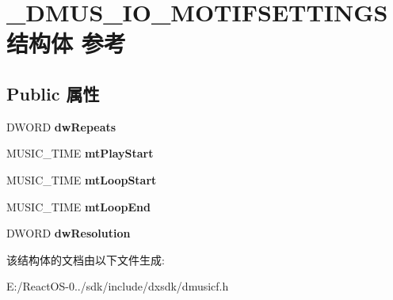 \hypertarget{struct___d_m_u_s___i_o___m_o_t_i_f_s_e_t_t_i_n_g_s}{}\section{\+\_\+\+D\+M\+U\+S\+\_\+\+I\+O\+\_\+\+M\+O\+T\+I\+F\+S\+E\+T\+T\+I\+N\+G\+S结构体 参考}
\label{struct___d_m_u_s___i_o___m_o_t_i_f_s_e_t_t_i_n_g_s}
\subsection*{Public 属性}
\begin{DoxyCompactItemize}
\item 
\mbox{\label{struct___d_m_u_s___i_o___m_o_t_i_f_s_e_t_t_i_n_g_s_a91cc23365415043e01413969b1cba8f9}} 
D\+W\+O\+RD {\bfseries dw\+Repeats}
\item 
\mbox{\label{struct___d_m_u_s___i_o___m_o_t_i_f_s_e_t_t_i_n_g_s_ac7180f66014bd309555893d0487dbc40}} 
M\+U\+S\+I\+C\+\_\+\+T\+I\+ME {\bfseries mt\+Play\+Start}
\item 
\mbox{\label{struct___d_m_u_s___i_o___m_o_t_i_f_s_e_t_t_i_n_g_s_a738e93904caf1188f41ed8041e70a5cf}} 
M\+U\+S\+I\+C\+\_\+\+T\+I\+ME {\bfseries mt\+Loop\+Start}
\item 
\mbox{\label{struct___d_m_u_s___i_o___m_o_t_i_f_s_e_t_t_i_n_g_s_aa4305dfbeef2f94cd519ee60876f41fb}} 
M\+U\+S\+I\+C\+\_\+\+T\+I\+ME {\bfseries mt\+Loop\+End}
\item 
\mbox{\label{struct___d_m_u_s___i_o___m_o_t_i_f_s_e_t_t_i_n_g_s_a0e1ceb3b379d6aef13ed07c1b69ec466}} 
D\+W\+O\+RD {\bfseries dw\+Resolution}
\end{DoxyCompactItemize}


该结构体的文档由以下文件生成\+:\begin{DoxyCompactItemize}
\item 
E\+:/\+React\+O\+S-\/0../sdk/include/dxsdk/dmusicf.\+h\end{DoxyCompactItemize}
